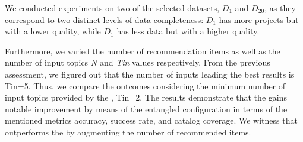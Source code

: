We conducted experiments on two of the selected datasets, \ie $D_{1}$ and $D_{20}$, as they correspond to two distinct levels of data completeness: $D_{1}$ has more projects but with a lower quality, while $D_{1}$ has less data but with a higher quality. %

Furthermore, we varied the number of recommendation items as well as the number of input topics \ie \emph{N} and \emph{Tin} values respectively. From the previous assessment, we figured out that the number of inputs leading the best results is Tin=5. Thus, we compare the outcomes considering the minimum number of input topics provided by the \MNB, \ie Tin=2. The results demonstrate that the \MNB gains notable improvement by means of the entangled configuration in terms of the mentioned metrics \ie accuracy, success rate, and catalog coverage. We witness that \TF outperforms the \MNB by augmenting the number of recommended items. 









